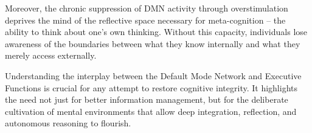 Moreover, the chronic suppression of DMN activity through
overstimulation deprives the mind of the reflective space necessary for
meta-cognition -- the ability to think about one's own thinking. Without
this capacity, individuals lose awareness of the boundaries between what
they know internally and what they merely access externally.

Understanding the interplay between the Default Mode Network and
Executive Functions is crucial for any attempt to restore cognitive
integrity. It highlights the need not just for better information
management, but for the deliberate cultivation of mental environments
that allow deep integration, reflection, and autonomous reasoning to
flourish.

